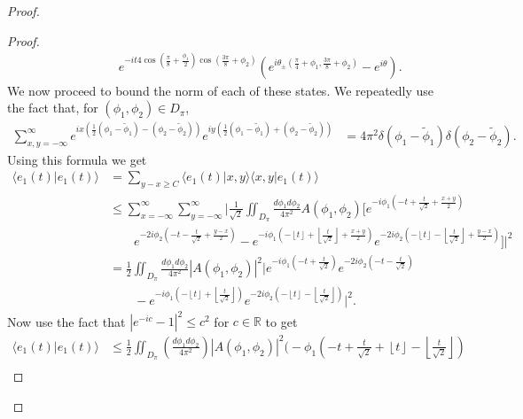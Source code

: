 \documentclass[../thesis-main/thesis-main]{subfiles}
\begin{document}
\begin{proof}
\begin{proof}
\begin{align*}
& \qquad \qquad e^{-it 4\cos(\frac{\pi}{8}+\frac{\phi_{1}}{2}) \cos(\frac{3\pi}{8}+\phi_{2})} \left(e^{i\theta_{\pm}(\frac{\pi}{4}+\phi_{1},\frac{3\pi}{8}+\phi_{2})}-e^{i\theta}\right).
\end{align*}
We now proceed to bound the norm of each of these states. We repeatedly
use the fact that, for $(\phi_{1},\phi_{2})\in D_{\pi}$, 
\begin{align*}
\sum_{x,y=-\infty}^{\infty}e^{ix\left(\frac{1}{2}\left(\phi_{1}-\tilde{\phi}_{1}\right)-\left(\phi_{2}-\tilde{\phi}_{2}\right)\right)}e^{iy\left(\frac{1}{2}\left(\phi_{1}-\tilde{\phi}_{1}\right)+\left(\phi_{2}-\tilde{\phi}_{2}\right)\right)}
 & =  4\pi^{2}\delta(\phi_{1}-\tilde{\phi}_{1}) \delta(\phi_{2}-\tilde{\phi}_{2}).
 \end{align*}
 Using this formula we get
 \begin{align*}
\langle e_{1}(t)|e_{1}(t)\rangle & =  \sum_{y-x\geq C}\langle e_{1}(t)|x,y\rangle\langle x,y|e_{1}(t)\rangle\\
   & \leq  \sum_{x=-\infty}^{\infty}\sum_{y=-\infty}^{\infty}\bigg|\frac{1}{\sqrt{2}}
	 	\iint_{D_{\pi}}\frac{d\phi_{1}d\phi_{2}}{4\pi^{2}}A(\phi_{1},\phi_{2})
	 	\bigg[e^{-i\phi_{1}\left(-t+\frac{t}{\sqrt{2}}+\frac{x+y}{2}\right)}\\
	&\qquad e^{-2i\phi_{2}\left(-t-\frac{t}
	 	{\sqrt{2}}+\frac{y-x}{2}\right)}-e^{-i\phi_{1}\left(-\left\lfloor t\right\rfloor +\left\lfloor \frac{t}{\sqrt{2}}\right\rfloor 
 		+\frac{x+y}{2}\right)}e^{-2i\phi_{2}\left(-\left\lfloor t\right\rfloor -\left\lfloor \frac{t}{\sqrt{2}}
 		\right\rfloor +\frac{y-x}{2}\right)}\bigg]\bigg|^{2}\\
 & =  \frac{1}{2}\iint_{D_{\pi}}\frac{d\phi_{1}d\phi_{2}}{4\pi^{2}}\left|A(\phi_{1},\phi_{2})
 		\right|^{2}\bigg|e^{-i\phi_{1}\left(-t+\frac{t}{\sqrt{2}}\right)}e^{-2i\phi_{2}\left(-t-\frac{t}
 		{\sqrt{2}}\right)}\\
 & \qquad -e^{-i\phi_{1}\left(-\left\lfloor t\right\rfloor +\left\lfloor \frac{t}
 		{\sqrt{2}}\right\rfloor \right)}e^{-2i\phi_{2}\left(-\left\lfloor t\right\rfloor -\left\lfloor 
 		\frac{t}{\sqrt{2}}\right\rfloor \right)}\bigg|^{2}.
\end{align*}
 Now use the fact that $\left|e^{-ic}-1\right|^{2}\leq c^{2}$ for
$c\in\mathbb{R}$ to get 
\begin{align*}
\langle e_{1}(t)|e_{1}(t)\rangle & \leq  \frac{1}{2}\iint_{D_{\pi}}\left(\frac{d\phi_{1}d\phi_{2}}
	{4\pi^{2}}\right)\left|A(\phi_{1},\phi_{2})\right|^{2}\Bigg(-\phi_{1}\left(-t+\frac{t}{\sqrt{2}}+
	\left\lfloor t\right\rfloor -\left\lfloor \frac{t}{\sqrt{2}}\right\rfloor \right)\\

\end{align*}
\end{proof}
\end{proof}
\end{document}
